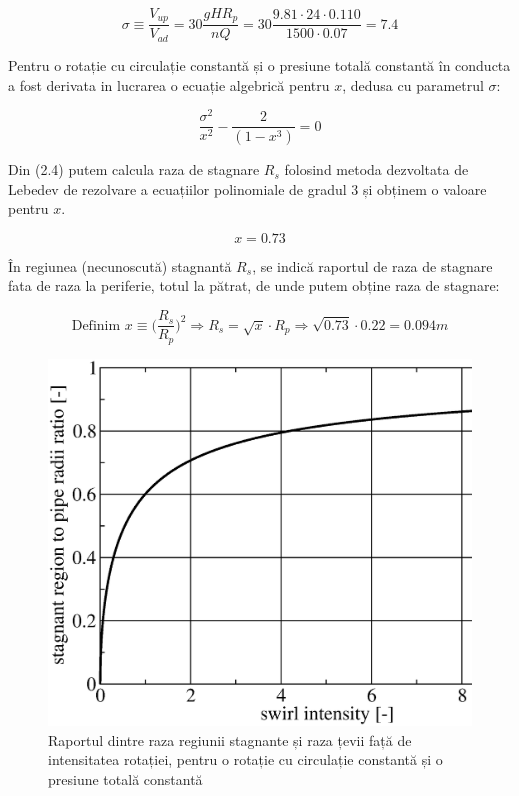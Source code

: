 \begin{equation}
\sigma \equiv \frac{V_{up}}{V_{ad}} = 30 \frac{g H R_{p}}{n Q} = 30 \frac{9.81 \cdot 24 \cdot 0.110}{1500 \cdot 0.07} = 7.4
\end{equation}

Pentru o rotație cu circulație constantă și o presiune totală constantă în conducta a fost derivata in lucrarea \cite{susanhub} o ecuație algebrică pentru $x$, dedusa cu parametrul $\sigma$:

\begin{equation}
\frac{\sigma^2}{x^2} - \frac{2}{(1-x^3)} = 0
\end{equation}

Din (2.4) putem calcula raza de stagnare $R_{s}$ folosind metoda dezvoltata de Lebedev \cite{lebedev1991formulae} de rezolvare a ecuațiilor polinomiale de gradul 3 și obținem o valoare pentru $x$.

\begin{equation}
x = 0.73
\end{equation}

În regiunea (necunoscută) stagnantă $R_{s}$, se indică raportul de raza de stagnare fata de raza la periferie, totul la pătrat, de unde putem obține raza de stagnare:

\begin{equation}
\text{Definim } x \equiv \bigg(\frac{R_{s}}{R_{p}}\bigg)^2 \Rightarrow R_{s} = \sqrt{x} \cdot R_{p} \Rightarrow \sqrt{0.73} \cdot 0.22 = 0.094\si{m}
\end{equation}

\begin{figure}[h!]
	\centering
	\includegraphics[scale=0.6]{figures/radius_stag-sigma.eps}
	\caption{Raportul dintre raza regiunii stagnante și raza țevii față de intensitatea rotației, pentru o rotație cu circulație constantă și o presiune totală constantă \cite{susanhub}}
	\label{Raportul dintre raza regiunii stagnante și raza țevii față de intensitatea rotației}
\end{figure}

